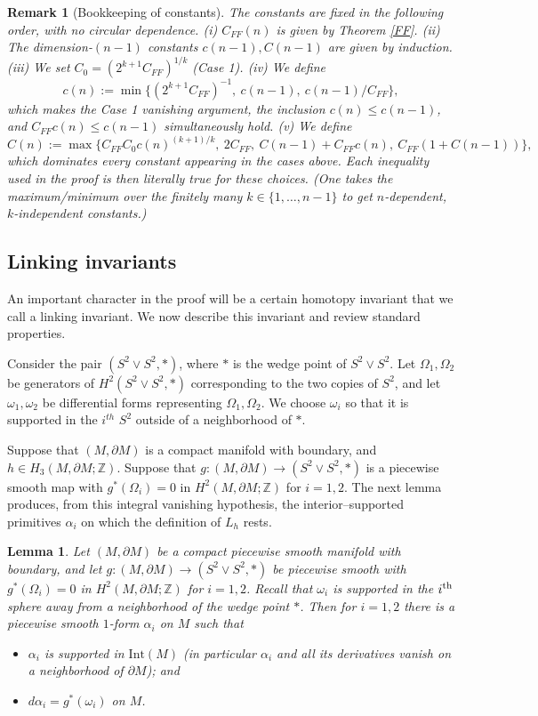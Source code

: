 \documentclass{amsart}
\newtheorem*{theorem 1}{Theorem 1}
\newtheorem*{theorem 2}{Theorem 2}
\newtheorem*{theorem 3}{Theorem 3}
\newtheorem{lemma}{Lemma}[section]
\newtheorem{remark}{Remark}
\numberwithin{equation}{section}
\newcommand{\ZZ}{\mathbb{Z}}
\begin{document}
\begin{remark}[Bookkeeping of constants]
The constants are fixed in the following order, with no circular
dependence.  (i) $C_{FF}(n)$ is given by Theorem \ref{FF}.  (ii)
The dimension-$(n-1)$ constants $c(n-1),C(n-1)$ are given by
induction.  (iii) We set $C_0 = (2^{k+1}C_{FF})^{1/k}$ (Case 1).
(iv) We define
$$ c(n) := \min\Big\{ (2^{k+1}C_{FF})^{-1},\ c(n-1),\
   c(n-1)/C_{FF}\Big\}, $$
which makes the Case 1 vanishing argument, the inclusion
$c(n) \le c(n-1)$, and $C_{FF}c(n)\le c(n-1)$ simultaneously hold.
(v) We define
$$ C(n) := \max\Big\{ C_{FF}C_0 c(n)^{(k+1)/k},\
   2 C_{FF},\ C(n-1) + C_{FF}c(n),\
   C_{FF}(1 + C(n-1))\Big\}, $$
which dominates every constant appearing in the cases above.  Each
inequality used in the proof is then literally true for these
choices.  (One takes the maximum/minimum over the finitely many
$k \in \{1,\dots,n-1\}$ to get $n$-dependent, $k$-independent
constants.)
\end{remark}



\subsection{Linking invariants}


An important character in the proof will be a certain homotopy invariant that we call a linking invariant.   We now describe this invariant and review standard properties.

 Consider the pair $(S^2 \vee S^2, *)$,  where $*$ is the wedge point of $S^2 \vee S^2$.    Let $\Omega_1, \Omega_2$ be generators of $H^2(S^2 \vee S^2,  *)$ corresponding to the two copies of $S^2$,  and let $\omega_1, \omega_2$ be differential forms representing $\Omega_1,  \Omega_2$.   We choose $\omega_i$ so that it is supported in the $i^{th}$ $S^2$ outside of a neighborhood of $*$. 

Suppose that $(M,  \partial M)$ is a compact manifold with boundary,  and $h \in H_3(M,  \partial M; \ZZ)$.   Suppose that $g: (M,  \partial M) \rightarrow (S^2 \vee S^2,  *)$ is a piecewise smooth map with $g^*(\Omega_i) = 0$ in $H^2(M,  \partial M; \ZZ)$ for $i=1,2$.   The next lemma produces, from this integral vanishing hypothesis, the interior--supported primitives $\alpha_i$ on which the definition of $L_h$ rests.

\begin{lemma} \label{lemmaprimitive}
Let $(M,\partial M)$ be a compact piecewise smooth manifold with
boundary, and let $g:(M,\partial M)\to(S^2\vee S^2,*)$ be piecewise
smooth with $g^*(\Omega_i)=0$ in $H^2(M,\partial M;\ZZ)$ for $i=1,2$.
Recall that $\omega_i$ is supported in the $i^{\rm th}$ sphere away
from a neighborhood of the wedge point $*$.  Then for $i=1,2$ there
is a piecewise smooth $1$-form $\alpha_i$ on $M$ such that
\begin{itemize}
\item $\alpha_i$ is supported in $\mathrm{Int}(M)$ (in particular
$\alpha_i$ and all its derivatives vanish on a neighborhood of
$\partial M$); and
\item $d\alpha_i = g^*(\omega_i)$ on $M$.
\end{itemize}
\end{lemma}
\end{document}
